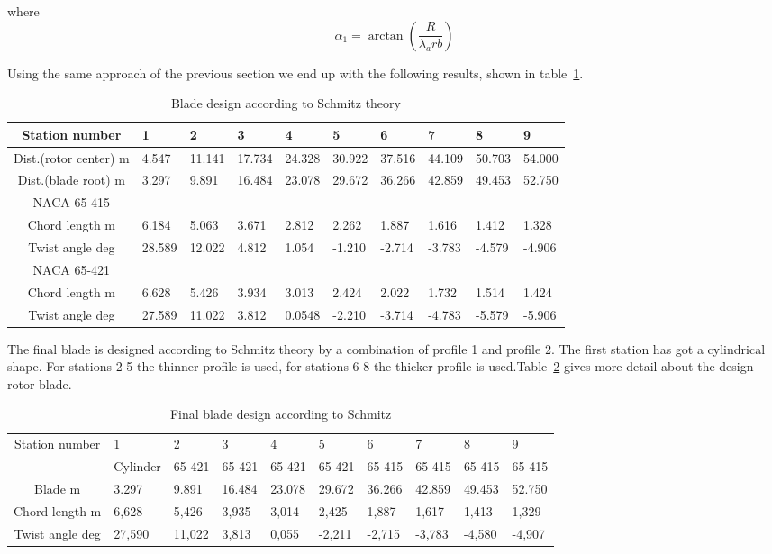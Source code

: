 \documentclass[10pt]{article}
\begin{document}
where
\begin{equation}
\alpha_1 = \arctan(\frac{R}{\lambda_a rb})
\end{equation}

Using the same approach of the previous section we end up with the following results, shown in table~\ref{blade_design_schmitz}.
\begin{table}[H]
\begin{tabular}{c| l l l l l l l l l}
\hline
Station number & 	1&	2&	3	&4	&5	&6	&7	&8	&9\\
\hline
Dist.(rotor center)	m&	4.547&	11.141&	17.734&	24.328&	30.922&	37.516&	44.109&	50.703&	54.000\\
Dist.(blade root)	m&	3.297&	9.891&	16.484&	23.078&	29.672&	36.266&	42.859&	49.453&	52.750\\
\hline
NACA 65-415\\
\hline
Chord length	m&		6.184 & 5.063 &	3.671&	2.812 & 2.262 & 1.887 & 1.616 &	1.412&	1.328\\
Twist angle	deg	&	28.589	& 12.022 &	4.812 &	1.054 &	-1.210 &	-2.714 &	-3.783	& -4.579 &	-4.906\\
\hline
NACA 65-421\\
\hline
Chord length	m	&	6.628&	5.426&	3.934&	3.013&	2.424&	2.022	&1.732&	1.514&	1.424\\
Twist angle	deg	&	27.589&	11.022&	3.812&	0.0548	&-2.210&	-3.714&-4.783&	-5.579	&-5.906\\
\hline
\end{tabular}
\caption{Blade design according to Schmitz theory}
\label{blade_design_schmitz}
\end{table}
The final blade is designed according to Schmitz theory by a combination of profile 1 and profile 2. The first station has got a cylindrical shape. For stations 2-5 the thinner profile is used, for stations 6-8 the thicker profile is used.Table~\ref{final_blade_design_schmitz} gives more detail about the design rotor blade.
\begin{table}[H]
\begin{tabular}{c| l l l l l l l l l}
\hline
Station number & 	1&	2&	3	&4	&5	&6	&7	&8	&9\\
&Cylinder&65-421&65-421&65-421&65-421& 65-415& 65-415& 65-415&65-415\\
\hline
Blade	m&	3.297&	9.891&	16.484&	23.078&	29.672&	36.266&	42.859&	49.453&	52.750\\
\hline
Chord length	m&	6,628	&5,426&	3,935	&3,014&	2,425&	1,887&	1,617&	1,413&	1,329\\
Twist angle	deg	&	27,590&	11,022&	3,813&	0,055&	-2,211&	-2,715&	-3,783&	-4,580&	-4,907\\
\hline
\end{tabular}
\caption{Final blade design according to Schmitz}
\label{final_blade_design_schmitz}
\end{table}
\end{document}
